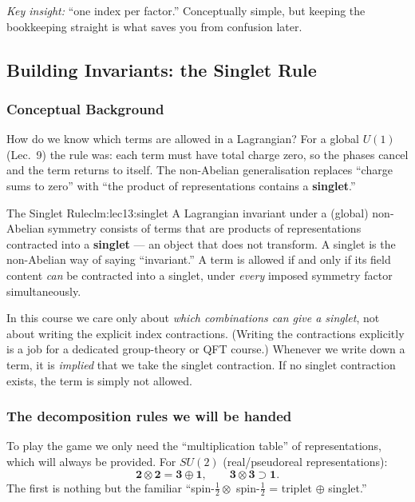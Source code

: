 \documentclass[../main.tex]{subfiles}
\begin{document}
\textit{Key insight:} ``one index per factor.'' Conceptually simple, but keeping the bookkeeping straight is what saves you from confusion later.

\subsection{Building Invariants: the Singlet Rule}\label{sec:lec13:invariants}

\subsubsection*{Conceptual Background}

How do we know which terms are allowed in a Lagrangian? For a global $U(1)$ (Lec.~9) the rule was: each term must have total charge zero, so the phases cancel and the term returns to itself. The non-Abelian generalisation replaces ``charge sums to zero'' with ``the product of representations contains a \textbf{singlet}.''

\begin{Claim}{The Singlet Rule}{clm:lec13:singlet}
A Lagrangian invariant under a (global) non-Abelian symmetry consists of terms that are products of representations contracted into a \textbf{singlet} --- an object that does not transform. A singlet is the non-Abelian way of saying ``invariant.'' A term is allowed if and only if its field content \emph{can} be contracted into a singlet, under \emph{every} imposed symmetry factor simultaneously.
\end{Claim}

\begin{note}
In this course we care only about \emph{which combinations can give a singlet}, not about writing the explicit index contractions. (Writing the contractions explicitly is a job for a dedicated group-theory or QFT course.) Whenever we write down a term, it is \emph{implied} that we take the singlet contraction. If no singlet contraction exists, the term is simply not allowed.
\end{note}

\subsubsection*{The decomposition rules we will be handed}

To play the game we only need the ``multiplication table'' of representations, which will always be provided. For $SU(2)$ (real/pseudoreal representations):
\begin{equation}
  \mathbf{2}\otimes\mathbf{2} = \mathbf{3}\oplus\mathbf{1},
  \qquad
  \mathbf{3}\otimes\mathbf{3} \supset \mathbf{1}.
  \label{eq:lec13:su2decomp}
\end{equation}
The first is nothing but the familiar ``spin-$\tfrac12\otimes$ spin-$\tfrac12$ = triplet $\oplus$ singlet.''
\end{document}
